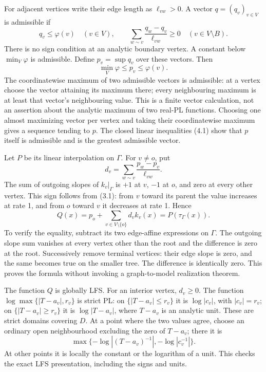 \documentclass[11pt]{article}
\begin{document}
For adjacent vertices write their edge length as \(\ell_{vw}>0\). A vector \(q=(q_v)_{v\in V}\) is admissible if
\[
q_v\leq\varphi(v)\quad(v\in V),\qquad
\sum_{w\sim v}\frac{q_w-q_v}{\ell_{vw}}\geq0
\quad(v\in V\setminus B).
\tag{4.1}
\]
There is no sign condition at an analytic boundary vertex. A constant below \(\min_V\varphi\) is admissible. Define \(p_v=\sup q_v\) over these vectors. Then
\[
\min_V\varphi\leq p_v\leq\varphi(v).
\]
The coordinatewise maximum of two admissible vectors is admissible: at a vertex choose the vector attaining its maximum there; every neighbouring maximum is at least that vector's neighbouring value. This is a finite vector calculation, not an assertion about the analytic maximum of two real-PL functions. Choosing one almost maximizing vector per vertex and taking their coordinatewise maximum gives a sequence tending to \(p\). The closed linear inequalities (4.1) show that \(p\) itself is admissible and is the greatest admissible vector.

Let \(P\) be its linear interpolation on \(\Gamma\). For \(v\ne o\), put
\[
d_v=\sum_{w\sim v}\frac{p_w-p_v}{\ell_{vw}}.
\]
The sum of outgoing slopes of \(k_v|_\Gamma\) is \(+1\) at \(v\), \(-1\) at \(o\), and zero at every other vertex. This sign follows from (3.1): from \(v\) toward its parent the value increases at rate 1, and from \(o\) toward \(v\) it decreases at rate 1. Hence
\[
Q(x)=p_o+\sum_{v\in V\setminus\{o\}}d_vk_v(x)
=P(\tau_\Gamma(x)).
\tag{4.2}
\]
To verify the equality, subtract its two edge-affine expressions on \(\Gamma\). The outgoing slope sum vanishes at every vertex other than the root and the difference is zero at the root. Successively remove terminal vertices: their edge slope is zero, and the same becomes true on the smaller tree. The difference is identically zero. This proves the formula without invoking a graph-to-model realization theorem.

The function \(Q\) is globally LFS. For an interior vertex, \(d_v\geq0\). The function \(\log\max\{|T-a_v|,r_v\}\) is strict PL: on \(\{|T-a_v|\leq r_v\}\) it is \(\log|c_v|\), with \(|c_v|=r_v\); on \(\{|T-a_v|\geq r_v\}\) it is \(\log|T-a_v|\), where \(T-a_v\) is an analytic unit. These are strict domains covering \(D\). At a point where the two values agree, choose an ordinary open neighbourhood excluding the zero of \(T-a_v\); there it is
\[
\max\{-\log|(T-a_v)^{-1}|,-\log|c_v^{-1}|\}.
\]
At other points it is locally the constant or the logarithm of a unit. This checks the exact LFS presentation, including the signs and units.
\end{document}
